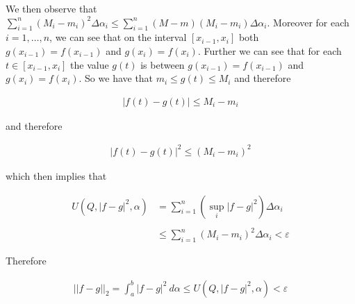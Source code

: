 \documentclass{article}
\begin{document}
  We then observe that $\displaystyle\sum_{i=1}^n(M_i-m_i)^2 \Delta \alpha_i \leq \sum_{i=1}^n(M-m)(M_i-m_i)\Delta\alpha_i$. Moreover for each $i=1, \dots, n$, we can see that on the interval $[x_{i-1},x_i]$ both $g(x_{i-1})=f(x_{i-1})$ and $g(x_i)=f(x_i)$.  Further we can see that for each $t\in [x_{i-1},x_i]$ the value $g(t)$ is between $g(x_{i-1})=f(x_{i-1})$ and $g(x_i)=f(x_i)$.  So we have that $m_i\leq g(t) \leq M_i$ and therefore

  \begin{align*}
    |f(t)-g(t)|\leq M_{i}-m_i 
  \end{align*}

  and therefore 

  \begin{align*}
    |f(t)-g(t)|^2 \leq (M_i-m_i)^2
  \end{align*}

  which then implies that
  
  \begin{align*}
    U(Q,|f-g|^2, \alpha) &= \sum_{i=1}^{n}\left(\sup_{i}|f-g|^2\right)\Delta\alpha_i \\\\
    &\leq \sum_{i=1}^{n}(M_i-m_i)^2\Delta\alpha_i < \varepsilon
  \end{align*}

  Therefore 

  \begin{align*}
    ||f-g||_2=\int_a^b|f-g|^2\ d\alpha \leq U(Q,|f-g|^2, \alpha) < \varepsilon
  \end{align*}
\end{document}
